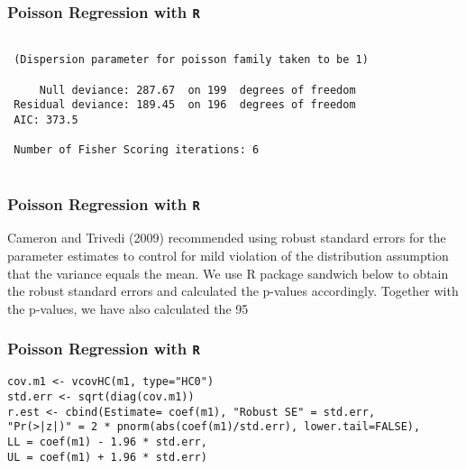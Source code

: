 \documentclass[00-GLMregslides.tex]{subfiles}
\begin{document}
\begin{frame}[fragile]

\frametitle{Poisson Regression with \texttt{R}}
\Large
\begin{framed}
\begin{verbatim}

 (Dispersion parameter for poisson family taken to be 1)
 
     Null deviance: 287.67  on 199  degrees of freedom
 Residual deviance: 189.45  on 196  degrees of freedom
 AIC: 373.5
 
 Number of Fisher Scoring iterations: 6
 
 \end{verbatim}
\end{framed}
\end{frame}

\begin{frame}[fragile]

\frametitle{Poisson Regression with \texttt{R}}
\Large 
Cameron and Trivedi (2009) recommended using robust standard errors for the parameter estimates to control for mild violation of the distribution assumption that the variance equals the mean. We use R package sandwich below to obtain the robust standard errors and calculated the p-values accordingly. Together with the p-values, we have also calculated the 95%

\end{frame}

\begin{frame}[fragile]

\frametitle{Poisson Regression with \texttt{R}}
\Large
\begin{framed}
\begin{verbatim}
cov.m1 <- vcovHC(m1, type="HC0")
std.err <- sqrt(diag(cov.m1))
r.est <- cbind(Estimate= coef(m1), "Robust SE" = std.err,
"Pr(>|z|)" = 2 * pnorm(abs(coef(m1)/std.err), lower.tail=FALSE),
LL = coef(m1) - 1.96 * std.err,
UL = coef(m1) + 1.96 * std.err)

\end{verbatim}
\end{framed}
\end{frame}
\end{document}
